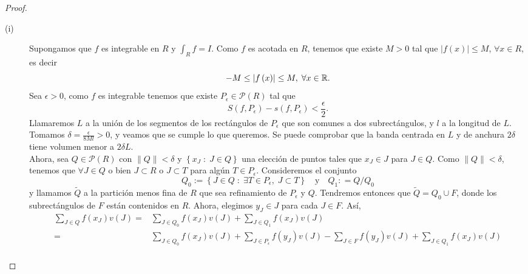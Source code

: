 \begin{proof}
\begin{description}
\item[(i)] Supongamos que $\displaystyle f $ es integrable en $\displaystyle R $ y $\displaystyle \int _{R}f = I $. Como $\displaystyle f $ es acotada en $\displaystyle R $, tenemos que existe $\displaystyle M > 0 $ tal que $\displaystyle \left|f\left(x\right)\right|\leq M $, $\displaystyle \forall x \in R $, es decir
	\[-M\leq \left|f\left(x\right)\right|\leq M, \; \forall x \in \mathbb{R} .\]
Sea $\displaystyle \epsilon > 0 $, como $\displaystyle f $ es integrable tenemos que existe $\displaystyle P_{\epsilon }\in \mathcal{P}\left(R\right) $ tal que 
\[S\left(f,P_{\epsilon }\right)-s\left(f,P_{\epsilon }\right)<\frac{\epsilon }{2} .\]
Llamaremos $\displaystyle L $ a la unión de los segmentos de los rectángulos de $\displaystyle P_{\epsilon } $ que son comunes a dos subrectángulos, y $\displaystyle l $ a la longitud de $\displaystyle L $. Tomamos $\displaystyle \delta =\frac{\epsilon }{8Ml} >0 $, y veamos que se cumple lo que queremos. Se puede comprobar que la banda centrada en $\displaystyle L $ y de anchura $\displaystyle 2\delta  $ tiene volumen menor a $\displaystyle 2\delta L $. \\
Ahora, sea $\displaystyle Q \in \mathcal{P}\left(R\right) $ con $\displaystyle \|Q\|<\delta  $ y $\displaystyle \left\{ x_{J} \; : \; J \in Q\right\}  $ una elección de puntos tales que $\displaystyle x_{J}\in J $ para $\displaystyle J \in Q $. Como $\displaystyle \|Q\|<\delta  $, tenemos que $\displaystyle \forall J \in Q $ o bien $\displaystyle J \subset R $ o $\displaystyle J \subset T $ para algún $\displaystyle T \in P_{\epsilon } $. Consideremos el conjunto
\[Q_{0}:= \left\{ J \in Q \; : \; \exists T \in P_{\epsilon }, \; J \subset T\right\}  \quad \text{y} \quad Q_{1}: = Q/Q_{0}\]
y llamamos $\displaystyle \tilde{Q} $ a la partición menos fina de $\displaystyle R $ que sea refinamiento de $\displaystyle P_{\epsilon } $ y $\displaystyle Q $. Tendremos entonces que $\displaystyle \tilde{Q} = Q_{0} \cup F $, donde los subrectángulos de $\displaystyle F $ están contenidos en $\displaystyle R $. Ahora, elegimos $\displaystyle y_{J} \in J $ para cada $\displaystyle J \in F $. Así,
\[
\begin{split}
	\sum_{J \in Q}f\left(x_{J}\right)v\left(J\right) = & \sum^{}_{J \in Q_{0}}f\left(x_{J}\right)v\left(J\right) + \sum^{}_{J \in Q_{1}}f\left(x_{J}\right)v\left(J\right) \\
	= & \sum^{}_{J \in Q_{0}}f\left(x_{J}\right)v\left(J\right) + \sum^{}_{J \in P_{\epsilon }}f\left(y_{J}\right)v\left(J\right) -\sum^{}_{J \in F}f\left(y_{J}\right)v\left(J\right)+\sum^{}_{J \in Q_{1}}f\left(x_{J}\right)v\left(J\right)\\

\end{split}\]
\end{description}
\end{proof}
